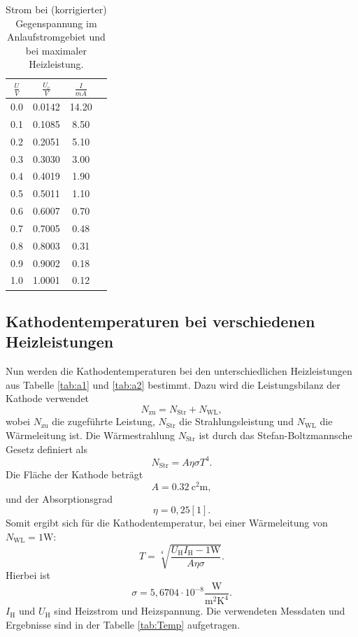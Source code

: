 \begin{table} [H]
	\centering
	\caption{Strom bei (korrigierter) Gegenspannung im Anlaufstromgebiet und bei maximaler Heizleistung.}
	\label{tab:c}
	\begin{tabular}{S[table-format=4.2]ccc}
		\toprule
		{$\frac{U}{V}$}&{$\frac{U_{\text{c}}}{V}$}&{$\frac{I}{mA}$} \\
		 &0.0142 &14.20\\
		0.1 &0.1085 &8.50\\
		0.2 &0.2051 &5.10\\
		0.3 &0.3030 &3.00\\
		0.4 &0.4019 &1.90\\
		0.5 &0.5011 &1.10\\
		0.6 &0.6007 &0.70\\
		0.7 &0.7005 &0.48\\
		0.8 &0.8003 &0.31\\
		0.9 &0.9002 &0.18\\
		1.0 &1.0001 &0.12\\
		\bottomrule 
	\end{tabular}
\end{table}	
	
\subsection{Kathodentemperaturen bei verschiedenen Heizleistungen}
Nun werden die Kathodentemperaturen bei den unterschiedlichen Heizleistungen aus Tabelle \ref{tab:a1} und \ref{tab:a2} bestimmt.
Dazu wird die Leistungsbilanz der Kathode verwendet
\begin{equation*}
	N_\text{zu} = N_\text{Str} + N_\text{WL},
\end{equation*}
wobei $N_\text{zu}$ die zugeführte Leistung, $N_\text{Str}$ die Strahlungsleistung und $N_\text{WL}$ die Wärmeleitung ist.
Die Wärmestrahlung $N_\text{Str}$ ist durch das Stefan-Boltzmannsche Gesetz definiert als
\begin{equation*}
	N_\text{Str} = A\eta\sigma T^4 .
\end{equation*}
Die Fläche der Kathode beträgt
\begin{equation*}
	A = \SI{0.32}{\square\centi\metre},
\end{equation*}
und der Absorptionsgrad 
\begin{equation*}
	\eta = 0,25   [1].
\end{equation*}
Somit ergibt sich für die Kathodentemperatur, bei einer Wärmeleitung von $N_\text{WL} = 1 \text{W}$:
\begin{equation*}
	T = \sqrt[4]{\frac{U_\text{H}I_\text{H} -1 \text{W}}{A\eta\sigma}} .
\end{equation*}
Hierbei ist 
\begin{equation*}
	\sigma = 5,6704 \cdot  10^{-8} \frac{\text{W}}{\text{m}^2\text{K}^4} .
\end{equation*}
$I_\text{H}$ und $U_\text{H}$ sind Heizstrom und Heizspannung. 
Die verwendeten Messdaten und Ergebnisse sind in der Tabelle \ref{tab:Temp} aufgetragen.


